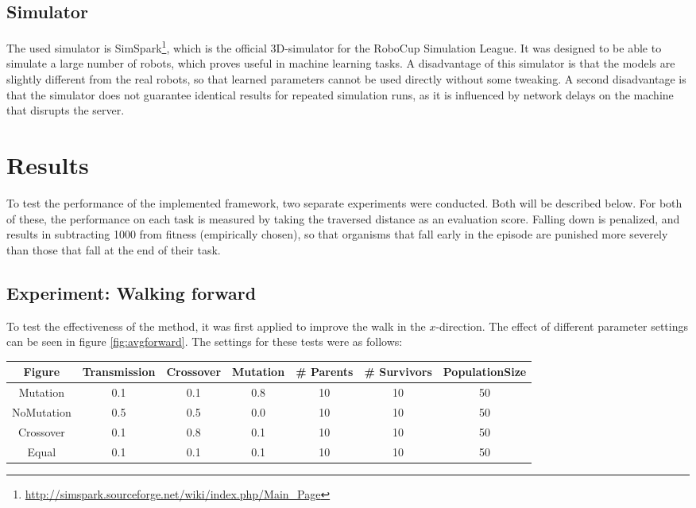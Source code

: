 \documentclass{article}
\begin{document}
\subsection{Simulator}
The used simulator is SimSpark\footnote{\url{http://simspark.sourceforge.net/wiki/index.php/Main_Page}}, which is the official 3D-simulator for the RoboCup Simulation League. It was designed to be able to simulate a large number of robots, which proves useful in machine learning tasks. A disadvantage of this simulator is that the models are 
slightly different from the real robots, so that learned parameters cannot be used directly without some tweaking. 
A second disadvantage is that the simulator does not guarantee identical results for repeated simulation runs, as it is influenced by network delays on the machine that disrupts the server. 

\section{Results}
To test the performance of the implemented framework, two separate experiments were conducted. Both will be described below. For both of these, the performance on each task is measured by taking the traversed distance as an evaluation score. Falling down is penalized, and results in subtracting 1000 from fitness (empirically chosen), so that organisms that fall early in the episode are punished more severely than those that fall at the end of their task.

\subsection{Experiment: Walking forward}
To test the effectiveness of the method, it was first applied to improve the walk in the $x$-direction. The effect of different parameter settings can be seen in figure \ref{fig:avgforward}. The settings for these tests were as follows:

\vspace{4mm}
\begin{tabular}{c | c          c           c           c         c             c  }
 Figure      &  Transmission & Crossover & Mutation & \# Parents & \# Survivors & PopulationSize \\
 \hline
 Mutation    &  0.1              & 0.1           & 0.8          &  10  & 10  & 50  \\ 
 NoMutation  &  0.5              & 0.5           & 0.0          &  10  & 10  & 50  \\
 Crossover   &  0.1              & 0.8           & 0.1          &  10  & 10  & 50  \\
 Equal       &  0.1              & 0.1           & 0.1          &  10  & 10  & 50  \\
\end{tabular}
\vspace{4mm}
\end{document}
